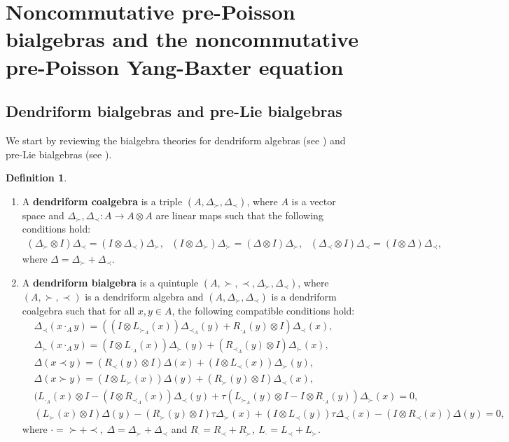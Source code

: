 \documentclass[12pt]{amsart}
\theoremstyle{definition}
\newtheorem{defi}[thm]{Definition}
\begin{document}
\section{Noncommutative pre-Poisson bialgebras and the noncommutative pre-Poisson Yang-Baxter equation}

\subsection{Dendriform bialgebras and pre-Lie bialgebras}
We start by reviewing the bialgebra theories for dendriform algebras (see \cite{B2}) and pre-Lie bialgebras (see \cite{B1}).
\begin{defi} 
	\begin{enumerate}
		\item A {\bf dendriform coalgebra} is a triple $(A,\Delta_{\succ},\Delta_{\prec})$, where
$A$ is a vector space and $\Delta_{\succ},\Delta_{\prec}:A\longrightarrow A\otimes A$ are linear maps such that
the following conditions hold:
\begin{align*}
( \Delta_{\succ}\otimes I)\Delta_{\prec}=(I\otimes\Delta_{\prec})\Delta_{\succ},\ \ \ 
(I\otimes \Delta_{\succ})\Delta_{\succ}=(\Delta\otimes I)\Delta_{\succ}, \ \ \
( \Delta_{\prec}\otimes I)\Delta_{\prec}=(I\otimes\Delta)\Delta_{\prec},\end{align*}
where $\Delta=\Delta_{\succ}+\Delta_{\prec}.$
\item A {\bf dendriform bialgebra} is a quintuple $(A,\succ,\prec,\Delta_{\succ},\Delta_{\prec})$,
 where $(A,\succ,\prec)$ is a dendriform algebra and $(A,\Delta_{\succ},\Delta_{\prec}
		)$ is a dendriform coalgebra such that for all $x,y\in A$,
	 the following compatible conditions hold:
\begin{align*}&\Delta_{\prec}(x\cdot_{A} y)=((I\otimes L_{\succ_{A}} (x))\Delta_{\prec_{A}}(y)+R_{\cdot_{A}}(y)\otimes I)\Delta_{\prec}(x),\\&
\Delta_{\succ}(x\cdot_{A} y)=(I\otimes L_{\cdot_{A}}(x))\Delta_{\succ}(y)+(R_{\prec_{A}} (y)\otimes I)\Delta_{\succ}(x),\\&
\Delta(x\prec y)=(R_{\prec} (y)\otimes I)\Delta(x)+(I\otimes L_{\prec} (x))\Delta_{\succ}(y),\\&
\Delta(x\succ y)=(I\otimes L_{\succ} (x))\Delta(y)+(R_{\succ} (y)\otimes I)\Delta_{\prec}(x),\\&
(L_{\cdot_{A}} (x)\otimes I-(I\otimes R_{\prec_{A}} (x))\Delta_{\prec}(y)
+\tau(L_{\succ_{A}} (y)\otimes I-I\otimes  R_{\cdot_{A}} (y))\Delta_{\succ}(x)=0,\\&
(L_{\succ} (x)\otimes I)\Delta(y)-(R_{\succ} (y)\otimes I)\tau\Delta_{\succ}(x)
+(I\otimes L_{\prec} (y))\tau\Delta_{\prec}(x)-(I\otimes R_{\prec} (x))\Delta(y)=0,\end{align*}
where $\cdot=\succ+\prec,~\Delta=\Delta_{\succ}+\Delta_{\prec}$ and $R_{\cdot}=R_{\prec}+R_{\succ},~L_{\cdot}=L_{\prec}+L_{\succ}$.
\end{enumerate}
\end{defi}
\end{document}
